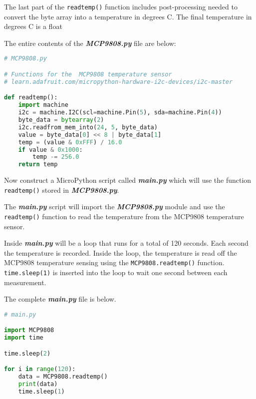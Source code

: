 \documentclass{book}
\newcommand{\passthrough}[1]{#1}
\begin{document}
The last part of the \passthrough{\lstinline!readtemp()!} function
includes post-processing needed to convert the byte array into a
temperature in degrees C. The final temperature in degrees C is a float
    




    
        The entire contents of the \textbf{\emph{MCP9808.py}} file are below:

\begin{lstlisting}[language=Python]
# MCP9808.py

# Functions for the  MCP9808 temperature sensor
# learn.adafruit.com/micropython-hardware-i2c-devices/i2c-master

def readtemp():
    import machine
    i2c = machine.I2C(scl=machine.Pin(5), sda=machine.Pin(4))
    byte_data = bytearray(2)
    i2c.readfrom_mem_into(24, 5, byte_data)
    value = byte_data[0] << 8 | byte_data[1]
    temp = (value & 0xFFF) / 16.0
    if value & 0x1000:
        temp -= 256.0
    return temp
\end{lstlisting}
    




    
        Now construct a MicroPython script called \textbf{\emph{main.py}} which
will use the function \passthrough{\lstinline!readtemp()!} stored in
\textbf{\emph{MCP9808.py}}.

The \textbf{\emph{main.py}} script will import the
\textbf{\emph{MCP9808.py}} module and use the
\passthrough{\lstinline!readtemp()!} function to read the temperature
from the MCP9808 temperature sensor.

Inside \textbf{\emph{main.py}} will be a loop that runs for a total of
120 seconds. Each second the temperature is recorded. Inside the loop,
the temperature is read off the MCP9808 temperature sensing using the
\passthrough{\lstinline!MCP9808.readtemp()!} function.
\passthrough{\lstinline!time.sleep(1)!} is inserted into the loop to
wait one second between each measurement.

The complete \textbf{\emph{main.py}} file is below.

\begin{lstlisting}[language=Python]
# main.py

import MCP9808
import time

time.sleep(2)

for i in range(120):
    data = MCP9808.readtemp()
    print(data)
    time.sleep(1)
\end{lstlisting}
    
\end{document}
